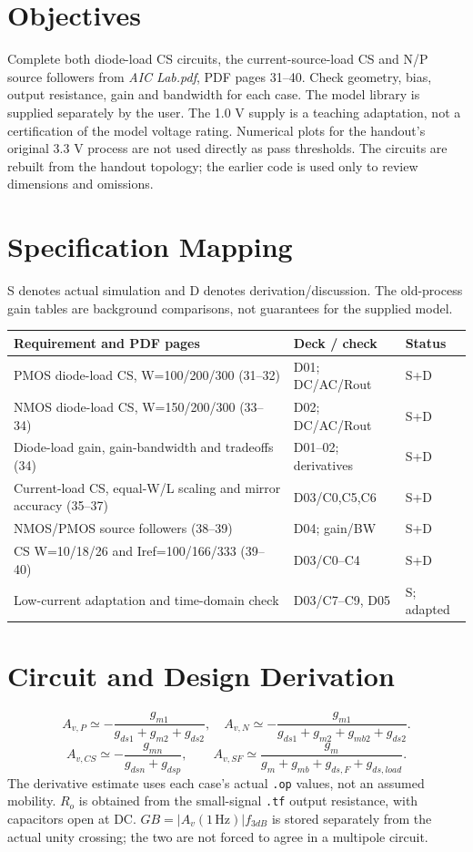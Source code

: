 \section{Objectives}
Complete both diode-load CS circuits, the current-source-load CS and N/P source followers from \textit{AIC Lab.pdf}, PDF pages 31--40. Check geometry, bias, output resistance, gain and bandwidth for each case. The model library is supplied separately by the user. The 1.0 V supply is a teaching adaptation, not a certification of the model voltage rating. Numerical plots for the handout's original 3.3 V process are not used directly as pass thresholds. The circuits are rebuilt from the handout topology; the earlier code is used only to review dimensions and omissions.

\section{Specification Mapping}
S denotes actual simulation and D denotes derivation/discussion. The old-process gain tables are background comparisons, not guarantees for the supplied model.
\small\begin{longtable}{p{.46\linewidth}p{.30\linewidth}p{.15\linewidth}}\toprule
Requirement and PDF pages & Deck / check & Status \\ \midrule\endhead
PMOS diode-load CS, W=100/200/300 (31--32) & D01; DC/AC/Rout & S+D \\
NMOS diode-load CS, W=150/200/300 (33--34) & D02; DC/AC/Rout & S+D \\
Diode-load gain, gain-bandwidth and tradeoffs (34) & D01--02; derivatives & S+D \\
Current-load CS, equal-W/L scaling and mirror accuracy (35--37) & D03/C0,C5,C6 & S+D \\
NMOS/PMOS source followers (38--39) & D04; gain/BW & S+D \\
CS W=10/18/26 and Iref=100/166/333 (39--40) & D03/C0--C4 & S+D \\
Low-current adaptation and time-domain check & D03/C7--C9, D05 & S; adapted \\
\bottomrule\end{longtable}\normalsize


\section{Circuit and Design Derivation}
\[
A_{v,P}\simeq-\frac{g_{m1}}{g_{ds1}+g_{m2}+g_{ds2}},\quad
A_{v,N}\simeq-\frac{g_{m1}}{g_{ds1}+g_{m2}+g_{mb2}+g_{ds2}}.
\]
\[
A_{v,CS}\simeq-\frac{g_{mn}}{g_{dsn}+g_{dsp}},\qquad
A_{v,SF}\simeq\frac{g_m}{g_m+g_{mb}+g_{ds,F}+g_{ds,load}}.
\]The derivative estimate uses each case's actual \texttt{.op} values, not an assumed mobility. $R_o$ is obtained from the small-signal \texttt{.tf} output resistance, with capacitors open at DC. $GB=|A_v(1\,\mathrm{Hz})|f_{3dB}$ is stored separately from the actual unity crossing; the two are not forced to agree in a multipole circuit.

